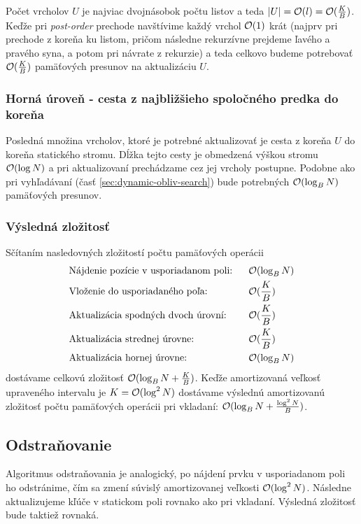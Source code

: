 Počet vrcholov $U$ je najviac dvojnásobok počtu listov a teda $|U| = \mathcal{O}(l) = \mathcal{O}(\frac{K}{B})$. Keďže pri \emph{post-order} prechode navštívime každý vrchol $\mathcal{O}(1)$ krát (najprv pri prechode z koreňa ku listom, pričom následne rekurzívne prejdeme ľavého a pravého syna, a potom pri návrate z rekurzie) a teda celkovo budeme potrebovať $\mathcal{O}(\frac{K}{B})$ pamäťových presunov na aktualizáciu $U$.

\subsubsection{Horná úroveň - cesta z najbližšieho spoločného predka do koreňa}
Posledná množina vrcholov, ktoré je potrebné aktualizovať je cesta z koreňa $U$ do koreňa statického stromu. Dĺžka tejto cesty je obmedzená výškou stromu $\mathcal{O}(\log{N})$ a pri aktualizovaní prechádzame cez jej vrcholy postupne. Podobne ako pri vyhľadávaní (časť \ref{sec:dynamic-obliv-search}) bude potrebných $\mathcal{O}(\log_B{N})$ pamäťových presunov.

\subsubsection{Výsledná zložitosť}
Sčítaním nasledovných zložitostí počtu pamäťových operácii
\[
\begin{aligned}
&\text{Nájdenie pozície v usporiadanom poli:} ~~ &&\mathcal{O}(\log_B{N}) \\
&\text{Vloženie do usporiadaného poľa:} &&\mathcal{O}(\frac{K}{B}) \\
&\text{Aktualizácia spodných dvoch úrovní:} &&\mathcal{O}(\frac{K}{B}) \\
&\text{Aktualizácia strednej úrovne:} &&\mathcal{O}(\frac{K}{B}) \\
&\text{Aktualizácia hornej úrovne:} &&\mathcal{O}(\log_B{N}) \\
\end{aligned}
\]
dostávame celkovú zložitosť $\mathcal{O}(\log_B{N} + \frac{K}{B})$. Keďže amortizovaná veľkosť upraveného intervalu je $K = \mathcal{O}(\log^2{N})$ dostávame výslednú amortizovanú zložitosť počtu pamäťových operácii pri vkladaní: $\mathcal{O}(\log_B{N} + \frac{\log^2{N}}{B})$.

\subsection{Odstraňovanie}
Algoritmus odstraňovania je analogický, po nájdení prvku v usporiadanom poli ho odstránime, čím sa zmení súvislý amortizovanej veľkosti $\mathcal{O}(\log^2{N})$. Následne aktualizujeme kľúče v statickom poli rovnako ako pri vkladaní. Výsledná zložitosť bude taktiež rovnaká.

